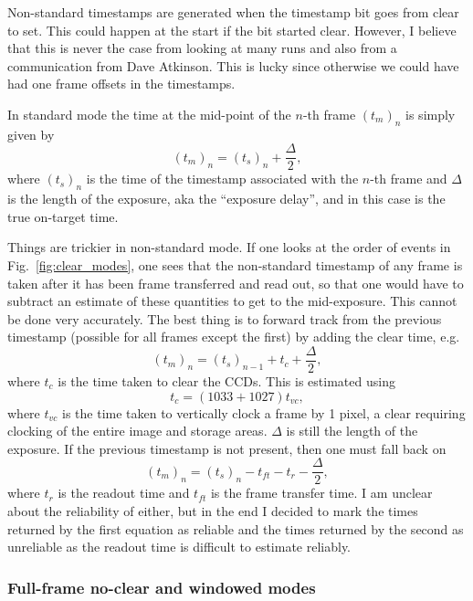 \documentclass[10pt,a4paper,twocolumn]{article}
\begin{document}
Non-standard timestamps are generated when the timestamp bit goes from
clear to set. This could happen at the start if the bit started clear.
However, I believe that this is never the case from looking at many runs and
also from a communication from Dave Atkinson. This is lucky since
otherwise we could have had one frame offsets in the timestamps.

In standard mode the time at the mid-point of the $n$-th frame
$(t_m)_n$ is simply given by
\begin{equation}
(t_m)_n = (t_s)_n + \frac{\Delta}{2},
\end{equation}
where $(t_s)_n$ is the time of the timestamp associated with the
$n$-th frame and $\Delta$ is the length of the exposure, aka the 
``exposure delay'', and in this case is the true on-target time.

Things are trickier in non-standard mode. If one looks at the order of
events in Fig.~\ref{fig:clear_modes}, one sees that the non-standard
timestamp of any frame is taken after it has been frame transferred
and read out, so that one would have to subtract an estimate of these
quantities to get to the mid-exposure. This cannot be done very
accurately. The best thing is to forward track from the previous
timestamp (possible for all frames except the first) by adding the 
clear time, e.g.
\begin{equation}
(t_m)_n = (t_s)_{n-1} + t_c + \frac{\Delta}{2},
\end{equation} 
where $t_c$ is the time taken to clear the CCDs. This is estimated using
\begin{equation}
t_c = (1033 + 1027) t_{vc},
\end{equation} 
where $t_{vc}$ is the time taken to vertically clock a frame by 1
pixel, a clear requiring clocking of the entire image and storage areas.
$\Delta$ is still the length of the exposure. If the previous
timestamp is not present, then one must fall back on
\begin{equation}
(t_m)_n = (t_s)_n - t_{ft} - t_r - \frac{\Delta}{2},
\end{equation} 
where $t_r$ is the readout time and $t_{ft}$ is the frame transfer
time. I am unclear about the reliability of either, but in the end I
decided to mark the times returned by the first equation as reliable
and the times returned by the second as unreliable as the readout time
is difficult to estimate reliably.

\subsubsection{Full-frame no-clear and windowed modes}
\end{document}

